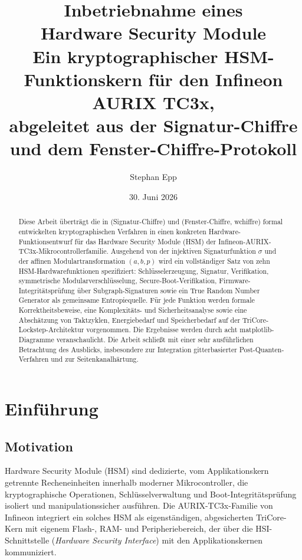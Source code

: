 ﻿\documentclass[a4paper,12pt]{article}
\title{\textbf{Inbetriebnahme eines}\\[0.2em]\textbf{Hardware Security Module}\\[0.3em]
\large Ein kryptographischer HSM-Funktionskern für den Infineon AURIX TC3x,\\
abgeleitet aus der Signatur-Chiffre und dem Fenster-Chiffre-Protokoll}
\author{Stephan Epp}
\date{30. Juni 2026}
\theoremstyle{definition}
\begin{document}
\maketitle

\begin{abstract}
\noindent
Diese Arbeit überträgt die in \cite{Epp26b} (Signatur-Chiffre) und \cite{Epp26c} (Fenster-Chiffre, wchiffre) formal entwickelten kryptographischen Verfahren in einen konkreten Hardware-Funktionsentwurf für das Hardware Security Module (HSM) der Infineon-AURIX-TC3x-Mikrocontrollerfamilie. Ausgehend von der injektiven Signaturfunktion $\sigma$ und der affinen Modulartransformation $(a,b,p)$ wird ein vollständiger Satz von zehn HSM-Hardwarefunktionen spezifiziert: Schlüsselerzeugung, Signatur, Verifikation, symmetrische Modularverschlüsselung, Secure-Boot-Verifikation, Firmware-Integritätsprüfung über Subgraph-Signaturen sowie ein True Random Number Generator als gemeinsame Entropiequelle. Für jede Funktion werden formale Korrektheitsbeweise, eine Komplexitäts- und Sicherheitsanalyse sowie eine Abschätzung von Taktzyklen, Energiebedarf und Speicherbedarf auf der TriCore-Lockstep-Architektur vorgenommen. Die Ergebnisse werden durch acht matplotlib-Diagramme veranschaulicht. Die Arbeit schließt mit einer sehr ausführlichen Betrachtung des Ausblicks, insbesondere zur Integration gitterbasierter Post-Quanten-Verfahren und zur Seitenkanalhärtung.
\end{abstract}

\tableofcontents
\newpage

\section{Einführung}

\subsection{Motivation}

Hardware Security Module (HSM) sind dedizierte, vom Applikationskern getrennte Recheneinheiten innerhalb moderner Mikrocontroller, die kryptographische Operationen, Schlüsselverwaltung und Boot-Integritätsprüfung isoliert und manipulationssicher ausführen. Die AURIX-TC3x-Familie von Infineon integriert ein solches HSM als eigenständigen, abgesicherten TriCore-Kern mit eigenem Flash-, RAM- und Peripheriebereich, der über die HSI-Schnittstelle (\emph{Hardware Security Interface}) mit den Applikationskernen kommuniziert.
\end{document}
